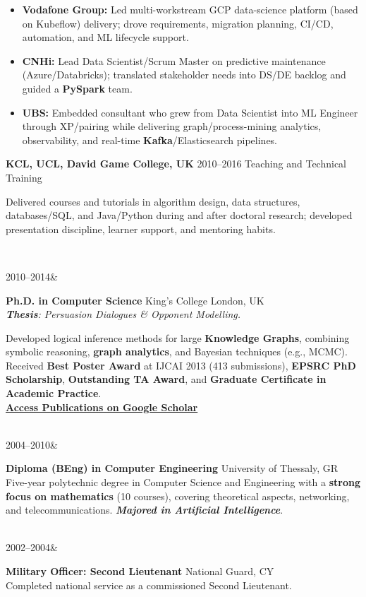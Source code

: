 \documentclass[]{../../../../friggeri-cv}
\renewcommand{\entry}[4]{%
  \parbox[t]{\dimexpr\textwidth-\entryleftinset\relax}{%
    \textbf{#2}%
    {\footnotesize\addfontfeature{Color=lightgray}\hspace{0.6em}#1}%
    \hfill%
    {\small\color{textcolor} #3}\\%
    #4\vspace{\parsep}%
  }\\}
\renewcommand{\entrytwo}[4]{%
  #1&\parbox[t]{14cm}{%
    \textbf{#2}%
    \hfill%
    {\small\color{textcolor} #3}\\%
    #4\vspace{\parsep}%
  }\\}
\begin{document}
\begin{entrylist}
{{        }
        \begin{itemize}[leftmargin=1.1em]
            \item \normalsize\textbf{Vodafone Group:} Led multi-workstream GCP data-science platform (based on Kubeflow) delivery; drove requirements, migration planning, CI/CD, automation, and ML lifecycle support.
            \item \normalsize\textbf{CNHi:} Lead Data Scientist/Scrum Master on predictive maintenance (Azure/Databricks); translated stakeholder needs into DS/DE backlog and guided a \textbf{PySpark} team.
            \item \normalsize\textbf{UBS:} Embedded consultant who grew from Data Scientist into ML Engineer through XP/pairing while delivering graph/process-mining analytics, observability, and real-time \textbf{Kafka}/Elasticsearch pipelines.
        \end{itemize}
    }
    \entry
    {2010--2016}
    {KCL, UCL, David Game College, UK}
    {Teaching and Technical Training}
    {
        {\small
        \setlength{\parindent}{0pt}
        \setlength{\leftskip}{0pt}
        Delivered courses and tutorials in algorithm design, data structures, databases/SQL, and Java/Python during and after doctoral research; developed presentation discipline, learner support, and mentoring habits.

        }
    }
\end{entrylist}
\newpage
\setlength{\parskip}{2pt}
\setlength{\parsep}{0pt}
\begin{entrylist2}
    \entrytwo
        {\small 2010--2014}
        {\small Ph.D. in Computer Science}
        {\small King's College London, UK}
        {\small \emph{\textbf{Thesis}: Persuasion Dialogues \& Opponent Modelling.}

        {\footnotesize Developed logical inference methods for large \textbf{Knowledge Graphs}, combining symbolic reasoning, \textbf{graph analytics}, and Bayesian techniques (e.g., MCMC). Received \textbf{Best Poster Award} at IJCAI 2013 (413 submissions), \textbf{EPSRC PhD Scholarship}, \textbf{Outstanding TA Award}, and \textbf{Graduate Certif\/icate in Academic Practice}.
        \\ \textbf{\textcolor{blue}{\href{https://scholar.google.com/citations?hl=en&user=Rr3KTx8AAAAJ}{\underline{Access Publications on Google Scholar}}}}}
        }
    \entrytwo
        {\small  2004--2010}
        {\small Diploma (BEng) in Computer Engineering}
        {\small University of Thessaly, GR}
        {\footnotesize Five-year polytechnic degree in Computer Science and Engineering with a \textbf{strong focus on mathematics} (10 courses), covering theoretical aspects, networking, and telecommunications. \emph{\textbf{Majored in Artif\/icial Intelligence}}.}
    \entrytwo
        {\small  2002--2004}
        {\small Military Of\/f\/icer: Second Lieutenant}
        {\small National Guard, CY}
        {\small Completed national service as a commissioned Second Lieutenant.}
\end{entrylist2}
\end{document}
